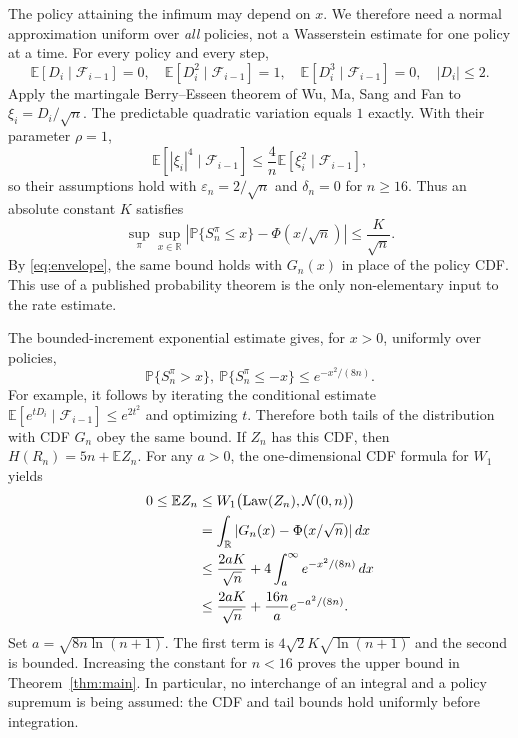 \documentclass[11pt,a4paper]{article}
\newcommand{\E}{\mathbb E}
\newcommand{\Prb}{\mathbb P}
\newcommand{\Law}{\operatorname{Law}}
\begin{document}
The policy attaining the infimum may depend on $x$. We therefore need
a normal approximation uniform over \emph{all} policies, not a
Wasserstein estimate for one policy at a time.
For every policy and every step,
\begin{equation}\label{eq:moments}
\E[D_i\mid\mathcal F_{i-1}]=0,\quad
\E[D_i^2\mid\mathcal F_{i-1}]=1,\quad
\E[D_i^3\mid\mathcal F_{i-1}]=0,\quad |D_i|\le2.
\end{equation}
Apply the martingale Berry--Esseen theorem of Wu, Ma, Sang and Fan
\cite[Theorem 1.1]{wu} to $\xi_i=D_i/\sqrt n$.
The predictable quadratic variation equals $1$ exactly. With their
parameter $\rho=1$,
\[
\E[|\xi_i|^4\mid\mathcal F_{i-1}]
\le\frac4n\E[\xi_i^2\mid\mathcal F_{i-1}],
\]
so their assumptions hold with $\varepsilon_n=2/\sqrt n$ and
$\delta_n=0$ for $n\ge16$. Thus an absolute constant $K$ satisfies
\begin{equation}\label{eq:be}
\sup_\pi\sup_{x\in\mathbb R}
\left|\Prb\{S_n^\pi\le x\}-\Phi(x/\sqrt n)\right|
\le\frac K{\sqrt n}.
\end{equation}
By \eqref{eq:envelope}, the same bound holds with $G_n(x)$ in place
of the policy CDF. This use of a published probability theorem is the
only non-elementary input to the rate estimate.

The bounded-increment exponential estimate gives, for $x>0$, uniformly
over policies,
\[
\Prb\{S_n^\pi>x\},\ \Prb\{S_n^\pi\le-x\}
\le e^{-x^2/(8n)}.
\]
For example, it follows by iterating the conditional estimate
$\E[e^{tD_i}\mid\mathcal F_{i-1}]\le e^{2t^2}$ and optimizing $t$.
Therefore both tails of the distribution with CDF $G_n$ obey the same
bound. If $Z_n$ has this CDF, then $H(R_n)=5n+\E Z_n$.
For any $a>0$, the one-dimensional CDF formula for $W_1$ yields
\begin{align}
0\le\E Z_n
&\le W_1\bigl(\Law(Z_n),\mathcal N(0,n)\bigr)\notag\\
&=\int_{\mathbb R}|G_n(x)-\Phi(x/\sqrt n)|\,dx\notag\\
&\le\frac{2aK}{\sqrt n}
       +4\int_a^\infty e^{-x^2/(8n)}\,dx\notag\\
&\le\frac{2aK}{\sqrt n}+\frac{16n}{a}e^{-a^2/(8n)}.
\label{eq:integrated}
\end{align}
Set $a=\sqrt{8n\ln(n+1)}$. The first term is
$4\sqrt2K\sqrt{\ln(n+1)}$ and the second is bounded. Increasing the
constant for $n<16$ proves the upper bound in Theorem~\ref{thm:main}.
In particular, no interchange of an integral and a policy supremum is
being assumed: the CDF and tail bounds hold uniformly before integration.
\end{document}
